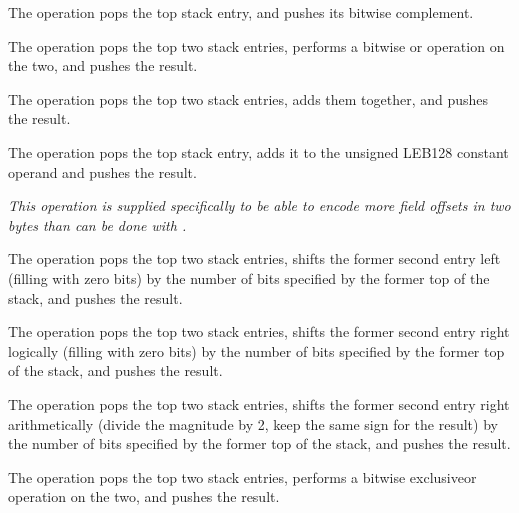 \begin{enumerate}[1. ]
The  operation pops the top stack entry, and pushes
its bitwise complement.

The  operation pops the top two stack entries, performs
a bitwise or operation on the two, and pushes the result.

The  operation pops the top two stack entries,
adds them together, and pushes the result.

The  operation pops the top stack entry,
adds it to the unsigned LEB128 constant operand and pushes
the result.

\textit{This operation is supplied specifically to be
able to encode more field offsets in two bytes than can be
done with
.}

The  operation pops the top two stack entries,
shifts the former second entry left (filling with zero bits)
by the number of bits specified by the former top of the stack,
and pushes the result.

The  operation pops the top two stack entries,
shifts the former second entry right logically (filling with
zero bits) by the number of bits specified by the former top
of the stack, and pushes the result.

The  operation pops the top two stack entries,
shifts the former second entry right arithmetically (divide
the magnitude by 2, keep the same sign for the result) by
the number of bits specified by the former top of the stack,
and pushes the result.

The  operation pops the top two stack entries,
performs a bitwise exclusive\dash or operation on the two, and
pushes the result.

\end{enumerate}


